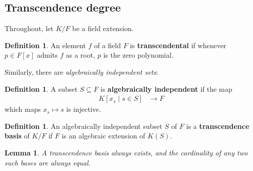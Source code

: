 \documentclass[12pt]{article}
\theoremstyle{plain}
\newtheorem{lemma}[thm]{Lemma}
\theoremstyle{definition}
\newtheorem{defn}[thm]{Definition} %
\begin{document}
\subsection{Transcendence degree}
\label{transcendence}
Throughout, let $K/F$ be a field extension.
\begin{defn}
An element $f$ of a field $F$ is \textbf{transcendental} if whenever $p \in F[x]$ admits $f$ as a root, $p$ is the zero polynomial.
\end{defn}
Similarly, there are \emph{algebraically independent sets}:
\begin{defn}\label{def:algebraic_independence}
A subset $S \subseteq F$ is \textbf{algebraically independent} if the map
\begin{align*}
    K[x_s\mid s\in S] &\to F
\end{align*}
which maps $x_s \mapsto s$ is injective.
\end{defn}
\begin{defn}
An algebraically independent subset $S$ of $F$ is a \textbf{transcendence basis} of $K/F$ if $F$ is an algebraic extension of $K(S)$.
\end{defn}
\begin{lemma}
A transcendence basis always exists, and the cardinality of any two such bases are always equal.
\end{lemma}
\end{document}
